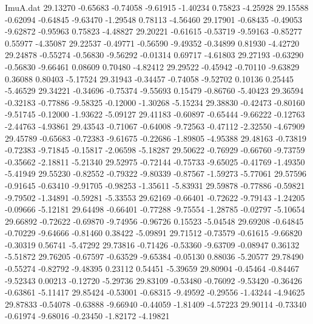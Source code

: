 \begin{filecontents}{ImuA.dat}
  29.13270   -0.65683   -0.74058   -9.61915   -1.40234    0.75823   -4.25928
  29.15588   -0.62094   -0.64845   -9.63470   -1.29548    0.78113   -4.56460
  29.17901   -0.68435   -0.49053   -9.62872   -0.95963    0.75823   -4.48827
  29.20221   -0.61615   -0.53719   -9.59163   -0.85277    0.55977   -4.35087
  29.22537   -0.49771   -0.56590   -9.49352   -0.34899    0.81930   -4.42720
  29.24878   -0.55274   -0.56830   -9.56292   -0.01314    0.69717   -4.61803
  29.27193   -0.63290   -0.56830   -9.66461    0.08609    0.70480   -4.82412
  29.29522   -0.45942   -0.70110   -9.63829    0.36088    0.80403   -5.17524
  29.31943   -0.34457   -0.74058   -9.52702    0.10136    0.25445   -5.46529
  29.34221   -0.34696   -0.75374   -9.55693    0.15479   -0.86760   -5.40423
  29.36594   -0.32183   -0.77886   -9.58325   -0.12000   -1.30268   -5.15234
  29.38830   -0.42473   -0.80160   -9.51745   -0.12000   -1.93622   -5.09127
  29.41183   -0.60897   -0.65444   -9.66222   -0.12763   -2.44763   -4.93861
  29.43543   -0.71067   -0.64008   -9.72563   -0.47112   -2.32550   -4.67909
  29.45789   -0.65683   -0.72383   -9.61675   -0.22686   -1.89805   -4.95388
  29.48163   -0.73819   -0.72383   -9.71845   -0.15817   -2.06598   -5.18287
  29.50622   -0.76929   -0.66760   -9.73759   -0.35662   -2.18811   -5.21340
  29.52975   -0.72144   -0.75733   -9.65025   -0.41769   -1.49350   -5.41949
  29.55230   -0.82552   -0.79322   -9.80339   -0.87567   -1.59273   -5.77061
  29.57596   -0.91645   -0.63410   -9.91705   -0.98253   -1.35611   -5.83931
  29.59878   -0.77886   -0.59821   -9.79502   -1.34891   -0.59281   -5.33553
  29.62169   -0.66401   -0.72622   -9.79143   -1.24205   -0.09666   -5.12181
  29.64498   -0.66401   -0.77288   -9.75554   -1.28785   -0.02797   -5.10654
  29.66892   -0.72622   -0.69870   -9.74956   -0.96726    0.15523   -5.04548
  29.69208   -0.64845   -0.70229   -9.64666   -0.81460    0.38422   -5.09891
  29.71512   -0.73579   -0.61615   -9.66820   -0.30319    0.56741   -5.47292
  29.73816   -0.71426   -0.53360   -9.63709   -0.08947    0.36132   -5.51872
  29.76205   -0.67597   -0.63529   -9.65384   -0.05130    0.88036   -5.20577
  29.78490   -0.55274   -0.82792   -9.48395    0.23112    0.54451   -5.39659
  29.80904   -0.45464   -0.84467   -9.52343    0.00213   -0.12720   -5.29736
  29.83109   -0.53480   -0.76092   -9.53420   -0.36426   -0.63861   -5.11417
  29.85424   -0.53001   -0.68315   -9.49592   -0.29556   -1.43244   -4.94625
  29.87833   -0.54078   -0.63888   -9.66940   -0.44059   -1.81409   -4.57223
  29.90114   -0.73340   -0.61974   -9.68016   -0.23450   -1.82172   -4.19821

\end{filecontents}
